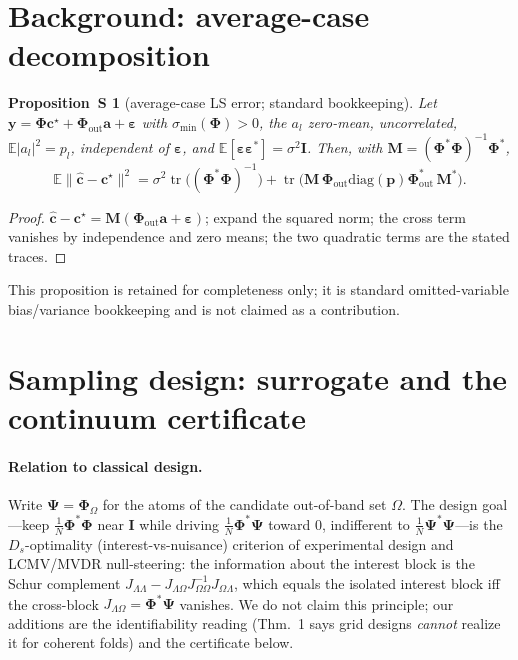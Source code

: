 \documentclass[10pt]{article}
\newtheorem{proposition}{Proposition~S}
\DeclareMathOperator{\tr}{tr}
\newcommand{\Phimat}{\bm{\Phi}}
\newcommand{\Psimat}{\bm{\Psi}}
\newcommand{\norm}[1]{\lVert#1\rVert}
\begin{document}
\section{Background: average-case decomposition}

\begin{proposition}[average-case LS error; standard bookkeeping]
Let $\bm y=\Phimat\bm c^\star+\Phimat_{\mathrm{out}}\bm a+\bm\varepsilon$ with
$\sigma_{\min}(\Phimat)>0$, the $a_l$ zero-mean, uncorrelated, $\mathbb E|a_l|^2=p_l$,
independent of $\bm\varepsilon$, and
$\mathbb E[\bm\varepsilon\bm\varepsilon^{*}]=\sigma^2\bm I$.  Then, with
$\bm M=(\Phimat^{*}\Phimat)^{-1}\Phimat^{*}$,
\[
\mathbb E\norm{\hat{\bm c}-\bm c^\star}^2
=\sigma^2\tr\!\big((\Phimat^{*}\Phimat)^{-1}\big)
+\tr\!\big(\bm M\,\Phimat_{\mathrm{out}}\mathrm{diag}(\bm p)\Phimat_{\mathrm{out}}^{*}\,
\bm M^{*}\big).
\]
\end{proposition}
\begin{proof}
$\hat{\bm c}-\bm c^\star=\bm M(\Phimat_{\mathrm{out}}\bm a+\bm\varepsilon)$; expand the
squared norm; the cross term vanishes by independence and zero means; the two quadratic
terms are the stated traces.
\end{proof}
This proposition is retained for completeness only; it is standard omitted-variable
bias/variance bookkeeping and is not claimed as a contribution.

\section{Sampling design: surrogate and the continuum certificate}

\paragraph{Relation to classical design.}  Write $\Psimat=\Phimat_{\Omega}$ for the atoms
of the candidate out-of-band set $\Omega$.  The design goal---keep
$\tfrac1N\Phimat^{*}\Phimat$ near $\bm I$ while driving $\tfrac1N\Phimat^{*}\Psimat$
toward $0$, indifferent to $\tfrac1N\Psimat^{*}\Psimat$---is the $D_s$-optimality
(interest-vs-nuisance) criterion of experimental design and LCMV/MVDR null-steering: the
information about the interest block is the Schur complement
$J_{\Lambda\Lambda}-J_{\Lambda\Omega}J_{\Omega\Omega}^{-1}J_{\Omega\Lambda}$, which equals
the isolated interest block iff the cross-block $J_{\Lambda\Omega}=\Phimat^{*}\Psimat$
vanishes.  We do not claim this principle; our additions are the identifiability reading
(Thm.~1 says grid designs \emph{cannot} realize it for coherent folds) and the certificate
below.
\end{document}
